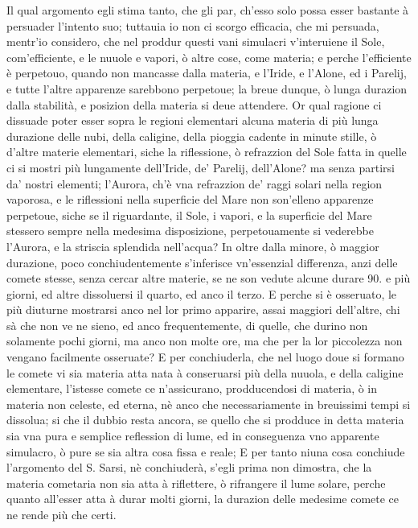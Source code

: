 \documentclass[11pt,twoside,openany]{book}
\begin{document}
Il qual argomento egli stima tanto, che gli par, ch'esso solo possa esser bastante à persuader l'intento suo; tuttauia io non ci scorgo efficacia, che mi persuada, mentr'io considero, che nel proddur questi vani simulacri v'interuiene il Sole, com'efficiente, e le nuuole e vapori, ò altre cose, come materia; e perche l'efficiente è perpetouo, quando non mancasse dalla materia, e l'Iride, e l'Alone, ed i Parelij, e tutte l'altre apparenze sarebbono perpetoue; la breue dunque, ò lunga durazion dalla stabilità, e posizion della materia si deue attendere. Or qual ragione ci dissuade poter esser sopra le regioni elementari alcuna materia di più lunga durazione delle nubi, della caligine, della pioggia cadente in minute stille, ò d'altre materie elementari, siche la riflessione, ò refrazzion del Sole fatta in quelle ci si mostri più lungamente dell'Iride, de' Parelij, dell'Alone? ma senza partirsi da' nostri elementi; l'Aurora, ch'è vna refrazzion de' raggi solari nella region vaporosa, e le riflessioni nella superficie del Mare non son'elleno apparenze perpetoue, siche se il riguardante, il Sole, i vapori, e la superficie del Mare stessero sempre nella medesima disposizione, perpetouamente si vederebbe l'Aurora, e la striscia splendida nell'acqua? In oltre dalla minore, ò maggior durazione, poco conchiudentemente s'inferisce vn'essenzial differenza, anzi delle comete stesse, senza cercar altre materie, se ne son vedute alcune durare 90. e più giorni, ed altre dissoluersi il quarto, ed anco il terzo. E perche si è osseruato, le più diuturne mostrarsi anco nel lor primo apparire, assai maggiori dell'altre, chi sà che non ve ne sieno, ed anco frequentemente, di quelle, che durino non solamente pochi giorni, ma anco non molte ore, ma che per la lor piccolezza non vengano facilmente osseruate? E per conchiuderla, che nel luogo doue si formano le comete vi sia materia atta nata à conseruarsi più della nuuola, e della caligine elementare, l'istesse comete ce n'assicurano, prodducendosi di materia, ò in materia non celeste, ed eterna, nè anco che necessariamente in breuissimi tempi si dissolua; si che il dubbio resta ancora, se quello che si prodduce in detta materia sia vna pura e semplice reflession di lume, ed in conseguenza vno apparente simulacro, ò pure se sia altra cosa fissa e reale; E per tanto niuna cosa conchiude l'argomento del S. Sarsi, nè conchiuderà, s'egli prima non dimostra, che la materia cometaria non sia atta à riflettere, ò rifrangere il lume solare, perche quanto all'esser atta à durar molti giorni, la durazion delle medesime comete ce ne rende più che certi.
\end{document}
